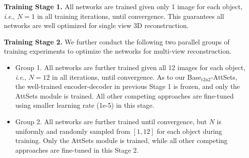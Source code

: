 \documentclass[twocolumn]{svjour3}    \pdfoutput=1
\newcommand{\nickname}{AttSets}
\newcommand{\ie}{\textit{i}.\textit{e}., }
\begin{document}
\textbf{Training Stage 1.} All networks are trained given only 1 image for each object, \ie $N=1$ in all training iterations, until convergence. This guarantees all networks are well optimized for single view 3D reconstruction.

\textbf{Training Stage 2.} We further conduct the following two parallel groups of training experiments to optimize the networks for multi-view reconstruction.
\begin{itemize}[leftmargin=0.3cm]
\item Group 1. All networks are further trained given all 12 images for each object, \ie $N=12$ in all iterations, until convergence. As to our Base$_{\textrm{r2n2}}$-AttSets, the well-trained encoder-decoder in previous Stage 1 is frozen, and only the \nickname{} module is trained. All other competing approaches are fine-tuned using smaller learning rate (1e-5) in this stage.

\item Group 2. All networks are further trained until convergence, but $N$ is uniformly and randomly sampled from $[1, 12]$ for each object during training. Only the \nickname{} module is trained, while all other competing approaches are fine-tuned in this Stage 2.
\end{itemize}
\end{document}
